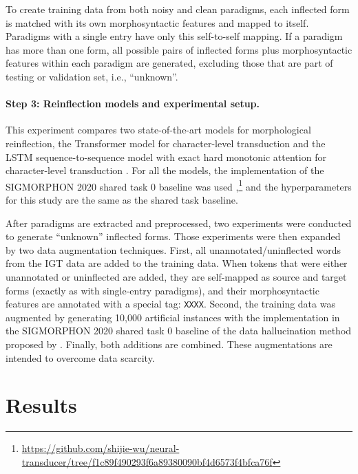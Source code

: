 To create training data from both noisy and clean paradigms, each inflected form is matched with its own morphosyntactic features and mapped to itself. Paradigms with a single entry have only this self-to-self mapping. If a paradigm has more than one form, all possible pairs of inflected forms plus morphosyntactic features within each paradigm are generated, excluding those that are part of testing or validation set, i.e., ``unknown''.
 

\paragraph{Step 3: Reinflection models and experimental setup.}
This experiment compares two state-of-the-art models for morphological reinflection, the Transformer model for character-level transduction \citep{wu2020applying} and the LSTM sequence-to-sequence model with exact hard monotonic attention for character-level transduction \citep{wu-cotterell-2019-exact}. For all the models, the implementation of the SIGMORPHON 2020 shared task 0 baseline was used \citep{vylomova2020sigmorphon},\footnote{\url{https://github.com/shijie-wu/neural-transducer/tree/f1c89f490293f6a89380090bf4d6573f4bfca76f}} and the hyperparameters for this study are the same as the shared task baseline.

After paradigms are extracted and preprocessed, two experiments were conducted to generate ``unknown'' inflected forms. Those experiments were then expanded by two data augmentation techniques. First, all unannotated/uninflected words from the IGT data are added to the training data. When tokens that were either unannotated or uninflected are added, they are self-mapped as source and target forms (exactly as with single-entry paradigms), and their morphosyntactic features are annotated with a special tag: \texttt{XXXX}.  Second, the training data was augmented by generating 10,000 artificial instances with the implementation in the SIGMORPHON 2020 shared task 0 baseline of the data hallucination method proposed by \citet{anastasopoulos-neubig-2019-pushing}. Finally, both additions are combined. These augmentations are intended to overcome data scarcity. 


\section{Results}
\label{sec:IGT2Presults}

